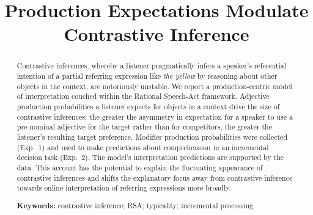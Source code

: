 \documentclass[10pt,letterpaper]{article}
\title{Production Expectations Modulate Contrastive Inference}
\begin{document}
\maketitle

\begin{abstract}
Contrastive inferences, whereby a listener pragmatically infers a speaker's referential intention of a partial referring expression like \emph{the yellow} by reasoning about other objects in the context, are notoriously unstable. We report a production-centric model of interpretation couched within the Rational Speech-Act framework. Adjective production probabilities a listener expects for objects in a context drive the size of contrastive inferences: the greater the asymmetry in expectation for a speaker to use a pre-nominal adjective for the target rather than for competitors, the greater the listener's resulting target preference. Modifier production probabilities were collected (Exp.~1) and used to make predictions about comprehension in an incremental decision task (Exp.~2). The model's interpretation predictions are supported by the data. This account has the potential to explain the fluctuating appearance of contrastive inferences and shifts the explanatory focus away from contrastive inference towards online interpretation of referring expressions more broadly.



\textbf{Keywords:} 
contrastive inference; RSA; typicality; incremental processing
\end{abstract}
\end{document}
